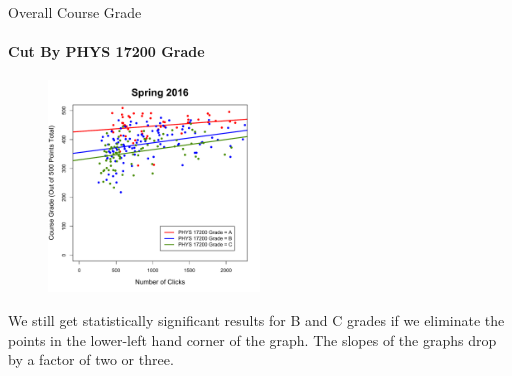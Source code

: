 \documentclass[xcolor=x11names,compress]{beamer}
\begin{document}
\begin{frame}{Overall Course Grade}
	\framesubtitle{Cut By PHYS 17200 Grade}
	\begin{figure}
		\includegraphics[width=0.5\textwidth]{img/overall_sp16_172_filtered.pdf}
	\end{figure}
	We still get statistically significant results for B and C grades if we eliminate the points in the lower-left hand corner of the graph. The slopes of the graphs drop by a factor of two or three.
\end{frame}
\end{document}
